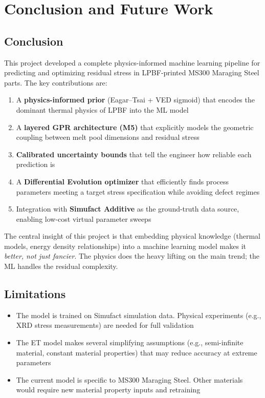 \documentclass[12pt,a4paper]{report}
\begin{document}
\chapter{Conclusion and Future Work}

\section{Conclusion}

This project developed a complete physics-informed machine learning pipeline for predicting and optimizing residual stress in LPBF-printed MS300 Maraging Steel parts. The key contributions are:

\begin{enumerate}
  \item A \textbf{physics-informed prior} (Eagar--Tsai + VED sigmoid) that encodes the dominant thermal physics of LPBF into the ML model
  \item A \textbf{layered GPR architecture (M5)} that explicitly models the geometric coupling between melt pool dimensions and residual stress
  \item \textbf{Calibrated uncertainty bounds} that tell the engineer how reliable each prediction is
  \item A \textbf{Differential Evolution optimizer} that efficiently finds process parameters meeting a target stress specification while avoiding defect regimes
  \item Integration with \textbf{Simufact Additive} as the ground-truth data source, enabling low-cost virtual parameter sweeps
\end{enumerate}

The central insight of this project is that embedding physical knowledge (thermal models, energy density relationships) into a machine learning model makes it \textit{better, not just fancier}. The physics does the heavy lifting on the main trend; the ML handles the residual complexity.

\section{Limitations}

\begin{itemize}
  \item The model is trained on Simufact simulation data. Physical experiments (e.g., XRD stress measurements) are needed for full validation
  \item The ET model makes several simplifying assumptions (e.g., semi-infinite material, constant material properties) that may reduce accuracy at extreme parameters
  \item The current model is specific to MS300 Maraging Steel. Other materials would require new material property inputs and retraining
\end{itemize}
\end{document}
